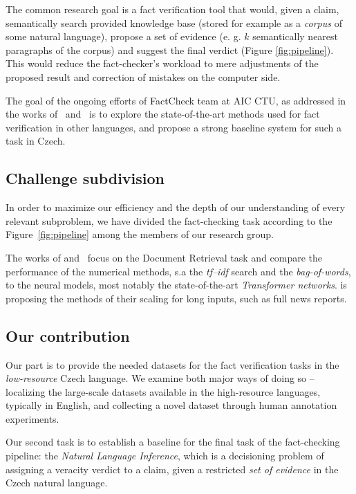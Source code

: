 The common research goal is a fact verification tool that would, given a claim, semantically search provided knowledge base (stored for example as a \textit{corpus} of some natural language), propose a set of evidence (e. g. $k$ semantically nearest paragraphs of the corpus) and suggest the final verdict (Figure \ref{fig:pipeline}). This would reduce the fact-checker's workload to mere adjustments of the proposed result and correction of mistakes on the computer side. 

The goal of the ongoing efforts of {\textsf{FactCheck}} team at {\textsf{AIC CTU}}, as addressed in the works of~\cite{rypar,dedkova} and~\cite{gazo} is to explore the state-of-the-art methods used for fact verification in other languages, and propose a strong baseline system for such a task in Czech.

\subsection{Challenge subdivision}
\label{sec:subdivision}
In order to maximize our efficiency and the depth of our understanding of every relevant subproblem, we have divided the fact-checking task according to the Figure~\ref{fig:pipeline} among the members of our research group. 

The works of \cite{rypar} and~\cite{dedkova} focus on the Document Retrieval task and compare the performance of the numerical methods, s.a the \textit{tf--idf} search and the \textit{bag-of-words}, to the neural models, most notably the state-of-the-art \textit{Transformer networks}\cite{vaswani}. \cite{gazo} is proposing the methods of their scaling for long inputs, such as full news reports.

\subsection{Our contribution}
Our part is to provide the needed datasets for the fact verification tasks in the \textit{low-resource} Czech language. We examine both major ways of doing so -- localizing the large-scale datasets available in the high-resource languages, typically in English, and collecting a novel dataset through human annotation experiments.

Our second task is to establish a baseline for the final task of the fact-checking pipeline: the \textit{Natural Language Inference}, which is a decisioning problem of assigning a veracity verdict to a claim, given a restricted \textit{set of evidence} in the Czech natural language.

